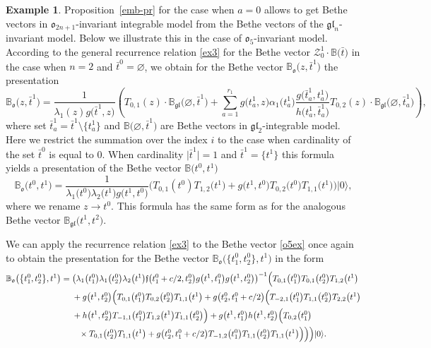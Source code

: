 \documentclass[pdftex]{sigma}
\newcommand{\bt}{{\bar t}}
\theoremstyle{definition}
\newtheorem{exam}[thm]{Example}
\def\BB{{\mathbb{B}}}
\def\r#1{\eqref{#1}}
\def\fgo{\mathfrak{f}}
\def\rvec{|0\rangle}
\def\BBo{\mathbb{B}_{\mathfrak{o}}}
\def\BBg{\mathbb{B}_{\mathfrak{gl}}}
\def\Z{\mathcal{Z}}
\begin{document}
\begin{exam}\label{Exam41}
Proposition~{\rm\ref{emb-pr}} for the case when $a=0$ allows
to get Bethe vectors in $\mathfrak{o}_{2n+1}$-invariant integrable model
from the Bethe vectors of the $\mathfrak{gl}_{n}$-invariant model.
Below we illustrate this in the case of $\mathfrak{o}_5$-invariant
model.
According to the general recurrence relation \r{ex3} for the Bethe vector
$\Z_0^1\cdot\BB\bigl(\bt\bigr)$ in the case when $n=2$ and $\bt^0=\varnothing$,
we obtain for the Bethe vector $\BBo\bigl(z,\bt^1\bigr)$ the presentation
\begin{equation*}
\BBo\bigl(z,\bt^1\bigr)=\frac{1}{\lambda_1(z) g\bigl(\bt^1,z\bigr)}
\left(
T_{0,1}(z)\cdot\BBg\bigl(\varnothing,\bt^1\bigr)+
\sum_{a=1}^{r_1}g\bigl(t^1_a,z\bigr) \alpha_1\bigl(t^1_a\bigr)
\frac{g\bigl(\bt^1_a,t^1_a\bigr)}{h\bigl(t^1_a,\bt^1_a\bigr)} T_{0,2}(z)\cdot\BBg\bigl(\varnothing,\bt^1_a\bigr)
\right),
\end{equation*}
where set $\bt^1_a=\bt^1\setminus\bigl\{t^1_a\bigr\}$ and
$\BB\bigl(\varnothing,\bt^1\bigr)$ are Bethe vectors in
$\mathfrak{gl}_2$-integrable model.
 Here we restrict the summation over the index $i$ to the case when cardinality of the set $\bt^0$
is equal to $0$. When cardinality $\big|\bt^1\big|=1$ and $\bt^1=\bigl\{t^1\bigr\}$ this formula
yields a presentation of the Bethe vector $\BB\bigl(t^0,t^1\bigr)$
\begin{equation}\label{o5ex}
\BBo\bigl(t^0,t^1\bigr)=\frac{1}{\lambda_1\bigl(t^0\bigr) \lambda_2\bigl(t^1\bigr) g\bigl(t^1,t^0\bigr)}
\bigl(T_{0,1}(t^0) T_{1,2}\bigl(t^1\bigr)+g\bigl(t^1,t^0\bigr) T_{0,2}\bigl(t^0\bigr) T_{1,1}\bigl(t^1\bigr)\bigr)\rvec ,
\end{equation}
 where we rename $z\to t^0$. This formula has the same form as for the analogous Bethe vector $\BBg\bigl(t^1,t^2\bigr)$.

We can apply the recurrence relation \r{ex3} to the Bethe vector \r{o5ex}
once again to obtain the presentation for the Bethe vector $\BBo\bigl(\bigl\{t^0_1,t^0_2\bigr\},t^1\bigr)$
in the form
\begin{align*}
\BBo\bigl(\bigl\{t^0_1,t^0_2\bigr\},t^1\bigr)={}&
\bigl({\lambda_1\bigl(t^0_1\bigr) \lambda_1\bigl(t^0_2\bigr) \lambda_2\bigl(t^1\bigr)
\fgo\bigl(t^0_1+c/2,t^0_2\bigr) g\bigl(t^1,t^0_1\bigr) g\bigl(t^1,t^0_2\bigr)}\bigr)^{-1}\Bigl(T_{0,1}\bigl(t^0_1\bigr) T_{0,1}\bigl(t^0_2\bigr) T_{1,2}\bigl(t^1\bigr)\\
&+
g\bigl(t^1,t^0_2\bigr)\Bigl(T_{0,1}\bigl(t^0_1\bigr) T_{0,2}\bigl(t^0_2\bigr) T_{1,1}\bigl(t^1\bigr)+ g\bigl(t^0_2,t^0_1+c/2\bigr)\Bigl(T_{-2,1}\bigl(t^0_1\bigr) T_{1,1}\bigl(t^0_2\bigr) T_{2,2}\bigl(t^1\bigr)\\
&+
h\bigl(t^1,t^0_2\bigr) T_{-1,1}\bigl(t^0_1\bigr) T_{1,2}\bigl(t^1\bigr) T_{1,1}\bigl(t^0_2\bigr)
\Bigr)+g\bigl(t^1,t^0_1\bigr) h\bigl(t^1,t^0_2\bigr)\Bigl(T_{0,2}\bigl(t^0_1\bigr) \\
& \phantom{+}{}\times T_{0,1}\bigl(t^0_2\bigr) T_{1,1}\bigl(t^1\bigr)+
g\bigl(t^0_2,t^0_1+c/2\bigr)
T_{-1,2}\bigl(t^0_1\bigr) T_{1,1}\bigl(t^0_2\bigr) T_{1,1}\bigl(t^1\bigr)\Bigr)\Bigr)\Bigr)\rvec .
\end{align*}


\end{exam}
\end{document}
